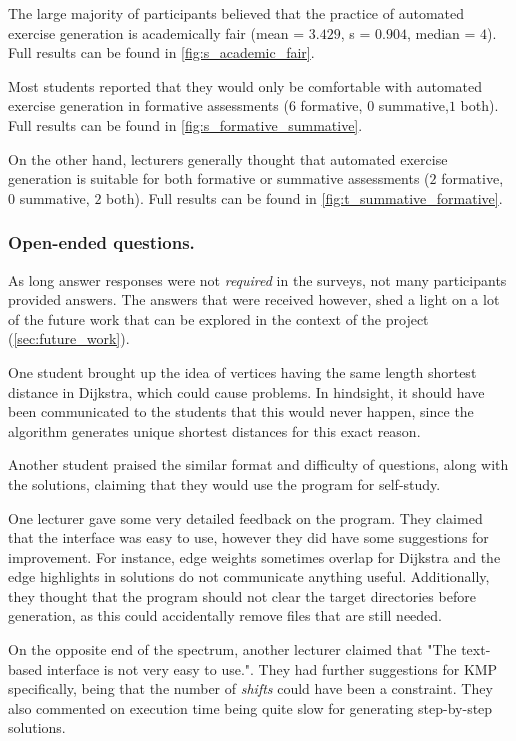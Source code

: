 \documentclass{l4proj}
\begin{document}
The large majority of participants believed that the practice of automated exercise generation is academically fair (mean = $3.429$, s = $0.904$, median = $4$). Full results can be found in \autoref{fig:s_academic_fair}.

Most students reported that they would only be comfortable with automated exercise generation in formative assessments ($6$ formative, $0$ summative,$1$ both).  Full results can be found in \autoref{fig:s_formative_summative}.

On the other hand, lecturers generally thought that automated exercise generation is suitable for both formative or summative assessments ($2$ formative, $0$ summative, $2$ both).  Full results can be found in \autoref{fig:t_summative_formative}.

\subsubsection{Open-ended questions.}

As long answer responses were not \emph{required} in the surveys, not many participants provided answers. The answers that were received however, shed a light on a lot of the future work that can be explored in the context of the project (\autoref{sec:future_work}).

One student brought up the idea of vertices having the same length shortest distance in Dijkstra, which could cause problems. In hindsight, it should have been communicated to the students that this would never happen, since the algorithm generates unique shortest distances for this exact reason. 

Another student praised the similar format and difficulty of questions, along with the solutions, claiming that they would use the program for self-study.

One lecturer gave some very detailed feedback on the program. They claimed that the interface was easy to use, however they did have some suggestions for improvement. For instance, edge weights sometimes overlap for Dijkstra and the edge highlights in solutions do not communicate anything useful. Additionally, they thought that the program should not clear the target directories before generation, as this could accidentally remove files that are still needed.

On the opposite end of the spectrum, another lecturer claimed that "The text-based interface is not very easy to use.". They had further suggestions for KMP specifically, being that the number of \emph{shifts} could have been a constraint. They also commented on execution time being quite slow for generating step-by-step solutions.
\end{document}
